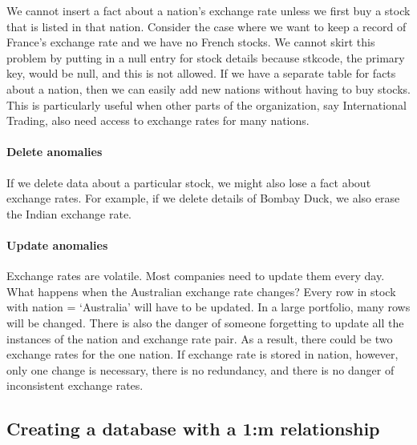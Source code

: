 \documentclass[
]{article}
\begin{document}
We cannot insert a fact about a nation's exchange rate unless we first
buy a stock that is listed in that nation. Consider the case where we
want to keep a record of France's exchange rate and we have no French
stocks. We cannot skirt this problem by putting in a null entry for
stock details because stkcode, the primary key, would be null, and this
is not allowed. If we have a separate table for facts about a nation,
then we can easily add new nations without having to buy stocks. This is
particularly useful when other parts of the organization, say
International Trading, also need access to exchange rates for many
nations.

\hypertarget{delete-anomalies}{%
\paragraph*{Delete anomalies}\label{delete-anomalies}}

If we delete data about a particular stock, we might also lose a fact
about exchange rates. For example, if we delete details of Bombay Duck,
we also erase the Indian exchange rate.

\hypertarget{update-anomalies}{%
\paragraph*{Update anomalies}\label{update-anomalies}}

Exchange rates are volatile. Most companies need to update them every
day. What happens when the Australian exchange rate changes? Every row
in stock with nation = `Australia' will have to be updated. In a large
portfolio, many rows will be changed. There is also the danger of
someone forgetting to update all the instances of the nation and
exchange rate pair. As a result, there could be two exchange rates for
the one nation. If exchange rate is stored in nation, however, only one
change is necessary, there is no redundancy, and there is no danger of
inconsistent exchange rates.

\hypertarget{creating-a-database-with-a-1m-relationship}{%
\subsection*{Creating a database with a 1:m relationship}\label{creating-a-database-with-a-1m-relationship}}
\end{document}
